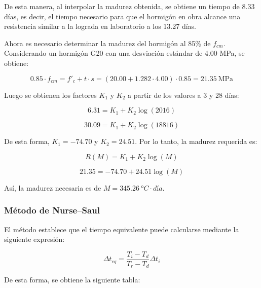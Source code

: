 De esta manera, al interpolar la madurez obtenida, se obtiene un tiempo de 8.33 días, es decir, el tiempo necesario para que el hormigón en obra alcance una resistencia similar a la lograda en laboratorio a los 13.27 días.

Ahora es necesario determinar la madurez del hormigón al 85\% de $f_{cm}$. Considerando un hormigón G20 con una desviación estándar de 4.00 MPa, se obtiene:

\begin{equation}
    0.85 \cdot f_{cm} = f'_c + t \cdot s = (20.00 + 1.282 \cdot 4.00)\cdot 0.85 = 21.35\ \text{MPa}
\end{equation}

Luego se obtienen los factores $K_1$ y $K_2$ a partir de los valores a 3 y 28 días:

\begin{equation}
    6.31 = K_1 + K_2 \log(2016)
\end{equation}

\begin{equation}
    30.09 = K_1 + K_2 \log(18816)
\end{equation}

De esta forma, $K_1 = -74.70$ y $K_2 = 24.51$. Por lo tanto, la madurez requerida es:

\begin{equation}
    R(M) = K_1 + K_2 \log(M)
\end{equation}

\begin{equation}
    21.35 = -74.70 + 24.51 \log(M)
\end{equation}

\noindent Así, la madurez necesaria es de $M = 345.26\ °C\cdot día$.

\subsubsection*{Método de Nurse–Saul}

El método establece que el tiempo equivalente puede calcularse mediante la siguiente expresión:

\begin{equation}
    \Delta t_{eq} = \frac{T_i - T_d}{T_r - T_d} \Delta t_i
\end{equation}

De esta forma, se obtiene la siguiente tabla:

